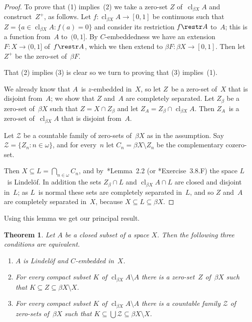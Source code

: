 \documentclass[a4paper]{amsart}
\newcommand\calZ{\mathcal{Z}}
\newcommand\cl{\operatorname{cl}}
\newcommand\clbeta[1][X]{\cl_{\beta #1}}
\theoremstyle{plain}
\newtheorem{theorem}{Theorem}[section]
\theoremstyle{definition}
\theoremstyle{remark}
\begin{document}
\begin{proof}
To prove that (1) implies~(2) we take a zero-set $Z$ of~$\clbeta A$ and
construct~$Z^+$, as follows.
Let $f:\clbeta A\to[0,1]$ be continuous such that $Z=\{a\in\clbeta A:f(a)=0\}$
and consider its restriction $f\restr A$ to~$A$; 
this is a function from~$A$ to~$(0,1]$.
By $C$-embeddedness we have an extension~$F:X\to(0,1]$ of~$f\restr A$, which
we then extend to $\beta F:\beta X\to[0,1]$.
Then let $Z^+$ be the zero-set of~$\beta F$.

\smallskip
That (2) implies (3) is clear so we turn to proving that (3) implies~(1).

We already know that $A$~is $z$-embedded in~$X$, so let $Z$~be a zero-set 
of~$X$ that is disjoint from~$A$; we show that $Z$ and~$A$ are completely 
separated.
Let $Z_\beta$ be a zero-set of~$\beta X$ such that $Z=X\cap Z_\beta$ and
let $Z_A=Z_\beta\cap\clbeta A$.
Then $Z_A$~is a zero-set of~$\clbeta A$ that is disjoint from~$A$.

Let $\calZ$ be a countable family of zero-sets of~$\beta X$ as in the 
assumption.
Say $\calZ=\{Z_n:n\in\omega\}$, and for every~$n$ 
let $C_n=\beta X\setminus Z_n$ be the complementary cozero-set.

Then $X\subseteq L=\bigcap_{n\in\omega}C_n$, and by~\cite{MR0133350}*{Lemma~2.2} 
(or \cite{MR1039321}*{Exercise~3.8.F}) 
the space $L$~is Lindel\"of.
In addition the sets $Z_\beta\cap L$ and $\clbeta A\cap L$ are closed
and disjoint in~$L$; as $L$~is normal these sets are completely separated 
in~$L$, and so $Z$ and~$A$ are completely separated in~$X$, 
because $X\subseteq L\subseteq\beta X$. 
\end{proof}

Using this lemma we get our principal result.

\begin{theorem}\label{thm.first}
Let $A$ be a closed subset of a space $X$.
Then the following three conditions are equivalent.
\begin{enumerate}
\item $A$ is Lindel\"of and $C$-embedded in~$X$.
\item For every compact subset $K$ of $\clbeta A\setminus A$ there is a 
      zero-set~$Z$ of~$\beta X$ such that 
      $K\subseteq Z\subseteq\beta X\setminus X$.
\item For every compact subset $K$ of $\clbeta A\setminus A$ there is a 
      countable family $\calZ$ of zero-sets of~$\beta X$ such that 
      $K\subseteq\bigcup\calZ\subseteq\beta X\setminus X$.
\end{enumerate}
\end{theorem}
\end{document}
